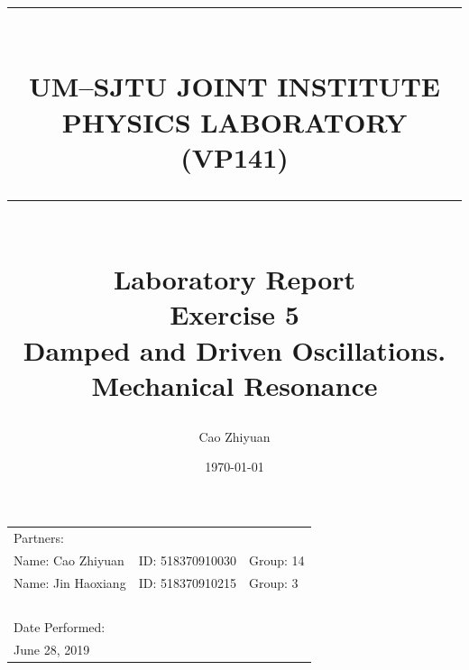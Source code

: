 \documentclass[a4paper,12pt]{article}
\title{ \rule{\textwidth}{0.3mm} \\UM–SJTU JOINT INSTITUTE \\ PHYSICS LABORATORY \\ (VP141) \\ \rule{\textwidth}{0.3mm} \\ [20 mm]  \Large{Laboratory Report} \\[5 mm]  Exercise 5 \\[1 mm] 
Damped and Driven Oscillations. \\Mechanical Resonance\\[20 mm]} %
\author{Cao Zhiyuan} %
\date{\today} %
\begin{document}
\scshape

\maketitle %

\begin{center}
\begin{tabular}{l l l}
\\[5 mm]
Partners:  \\
Name: Cao Zhiyuan & ID: 518370910030 & Group: 14 \\
Name: Jin Haoxiang & ID: 518370910215 & Group: 3 \\
~\\
Date Performed:\\
June 28, 2019\\
\end{tabular}
\end{center}

\thispagestyle{empty}


\newpage


\small\tableofcontents
\thispagestyle{empty}


\newpage

\setcounter{page}{1}
\upshape
\end{document}
